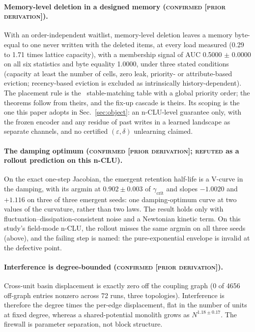 \documentclass{article} %
\begin{document}
\paragraph{Memory-level deletion in a designed memory (\textsc{confirmed [prior
derivation]}).} With an order-independent waitlist, memory-level deletion leaves a memory
byte-equal to one never written with the deleted items, at every load measured (0.29 to 1.71 times lattice capacity), with a membership signal of AUC 0.5000 $\pm$ 0.0000 on all
six statistics and byte equality 1.0000, under three stated conditions (capacity at least the number
of cells, zero leak, priority- or attribute-based eviction; recency-based eviction is excluded as
intrinsically history-dependent). %
The placement rule is the~\citet{blelloch_strongly_2007} stable-matching table with a global priority order;
the theorems follow from theirs, and the fix-up cascade is theirs. Its scoping is the one this
paper adopts in Sec.~\ref{sec:object}: an n-CLU-level guarantee only, with the frozen encoder and any
residue of past writes in a learned landscape as separate channels, and no certified
$(\varepsilon,\delta)$ unlearning claimed. %

\paragraph{The damping optimum (\textsc{confirmed [prior derivation]}; \textsc{refuted} as a
rollout prediction on this n-CLU).} On the exact one-step Jacobian, the emergent retention
half-life is a V-curve in the damping, with its argmin at $0.902\pm0.003$ of
$\gamma_{\text{crit}}$ and slopes $-1.0020$ and $+1.116$ on three of three emergent seeds: one
damping-optimum curve at two values of the curvature, rather than two laws.
The result holds only with fluctuation--dissipation-consistent noise and a Newtonian kinetic term.
On this study's field-mode n-CLU, the rollout misses the same argmin on all three seeds (above), and the
failing step is named: the pure-exponential envelope is invalid at the defective point.

\paragraph{Interference is degree-bounded (\textsc{confirmed [prior derivation]}).} Cross-unit
basin displacement is exactly zero off the coupling graph (0 of 4656 off-graph entries nonzero
across 72 runs, three topologies). Interference is therefore the degree times the per-edge
displacement, flat in the number of units at fixed degree, whereas a shared-potential monolith
grows as $N^{1.18\pm0.17}$. The firewall is parameter separation, not block structure.
\end{document}
